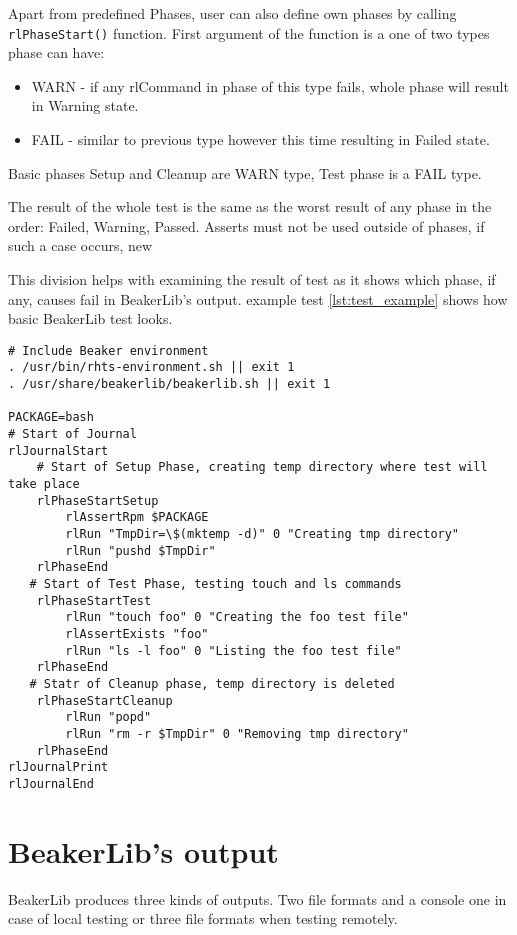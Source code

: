 Apart from predefined Phases, user can also define own phases by calling \texttt{rlPhaseStart()} function. First argument of the function is a one of two types phase can have:

\begin{itemize}
\item WARN - if any rlCommand in phase of this type fails, whole phase will result in Warning state.
\item FAIL - similar to previous type however this time resulting in Failed state.
\end{itemize}

Basic phases Setup and Cleanup are WARN type, Test phase is a FAIL type.

The result of the whole test is the same as the worst result of any phase in the order: Failed, Warning, Passed.
Asserts must not be used outside of phases, if such a case occurs, new  

This division helps with examining the result of test as it shows which phase, if any, causes fail in BeakerLib's output. 
example test \ref{lst:test_example} shows how basic BeakerLib test looks.

\begin{minipage}{\linewidth}
\begin{lstlisting}[style=beakerlib_bash,caption={BeakerLib basic test example},label={lst:test_example}]
# Include Beaker environment
. /usr/bin/rhts-environment.sh || exit 1
. /usr/share/beakerlib/beakerlib.sh || exit 1

PACKAGE=bash
# Start of Journal
rlJournalStart
    # Start of Setup Phase, creating temp directory where test will take place 
    rlPhaseStartSetup
        rlAssertRpm $PACKAGE
        rlRun "TmpDir=\$(mktemp -d)" 0 "Creating tmp directory"
        rlRun "pushd $TmpDir"
    rlPhaseEnd
   # Start of Test Phase, testing touch and ls commands
    rlPhaseStartTest
        rlRun "touch foo" 0 "Creating the foo test file"
        rlAssertExists "foo"
        rlRun "ls -l foo" 0 "Listing the foo test file"
    rlPhaseEnd
   # Statr of Cleanup phase, temp directory is deleted
    rlPhaseStartCleanup
        rlRun "popd"
        rlRun "rm -r $TmpDir" 0 "Removing tmp directory"
    rlPhaseEnd
rlJournalPrint
rlJournalEnd
\end{lstlisting}
\end{minipage}

\section{BeakerLib's output}
BeakerLib produces three kinds of outputs. Two file formats and a console one in case of local testing or three file formats when testing remotely.

